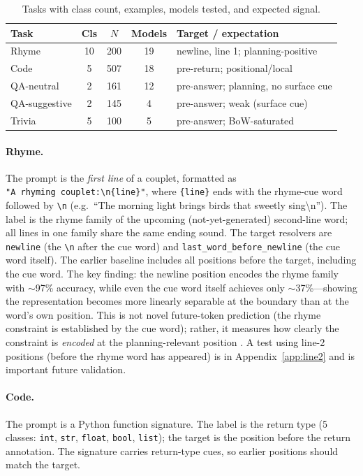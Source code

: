 \documentclass[11pt]{article}
\begin{document}
\begin{table}[t]
\centering\small
\setlength{\tabcolsep}{3pt}
\begin{tabular}{@{}lcccp{2.0cm}@{}}
\toprule
\textbf{Task} & \textbf{Cls} & \textbf{$N$} & \textbf{Models} & \textbf{Target / expectation} \\
\midrule
Rhyme & 10 & 200 & 19 & newline, line 1; planning-positive \\
Code & 5 & 507 & 18 & pre-return; positional/local \\
QA-neutral & 2 & 161 & 12 & pre-answer; planning, no surface cue \\
QA-suggestive & 2 & 145 & 4 & pre-answer; weak (surface cue) \\
Trivia & 5 & 100 & 5 & pre-answer; BoW-saturated \\
\bottomrule
\end{tabular}
\caption{Tasks with class count, examples, models tested, and expected signal.}
\label{tab:tasks}
\end{table}

\paragraph{Rhyme.} The prompt is the \emph{first line} of a couplet, formatted
as \texttt{"A~rhyming~couplet:\textbackslash n\{line\}"}, where \texttt{\{line\}}
ends with the rhyme-cue word followed by \texttt{\textbackslash n} (e.g.\ ``The
morning light brings birds that sweetly sing\textbackslash n''). The label is the
rhyme family of the upcoming (not-yet-generated) second-line word; all lines in
one family share the same ending sound. The target resolvers are \texttt{newline}
(the \texttt{\textbackslash n} after the cue word) and \texttt{last\_word\_before\_newline}
(the cue word itself). The earlier baseline includes all positions before the
target, including the cue word. The key finding: the newline position encodes the
rhyme family with $\sim$97\% accuracy, while even the cue word itself achieves
only $\sim$37\%---showing the representation becomes more linearly separable at
the boundary than at the word's own position. This is not novel future-token
prediction (the rhyme constraint is established by the cue word); rather, it
measures how clearly the constraint is \emph{encoded} at the planning-relevant
position \citep{maar2026}. A test using line-2 positions (before the rhyme word
has appeared) is in Appendix~\ref{app:line2} and is important future validation.

\paragraph{Code.} The prompt is a Python function signature. The label is the
return type (5 classes: \texttt{int}, \texttt{str}, \texttt{float}, \texttt{bool},
\texttt{list}); the target is the position before the return annotation. The
signature carries return-type cues, so earlier positions should match the target.
\end{document}
